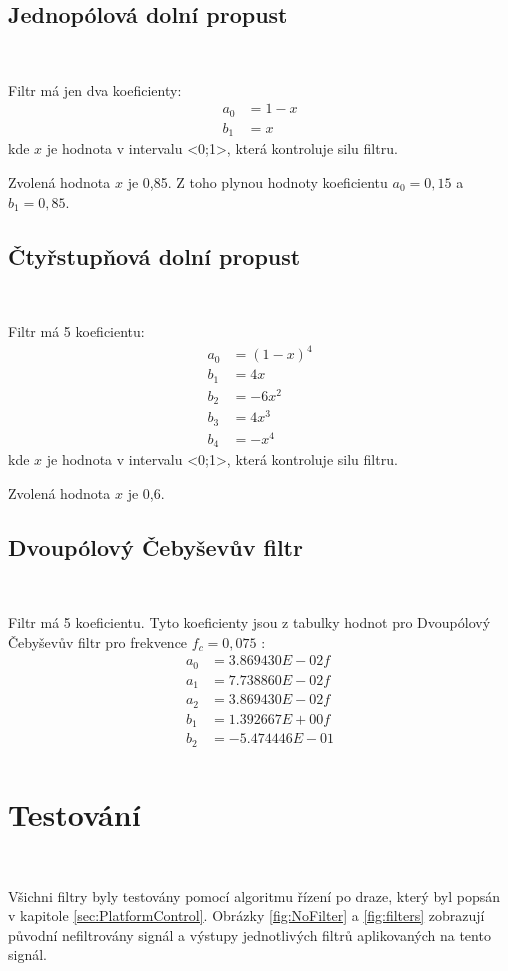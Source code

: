 \subsection{Jednopólová dolní propust}\

Filtr má jen dva koeficienty:
\begin{align}
a_0 &= 1 - x \\
b_1 &= x
\end{align}
kde $x$ je hodnota v intervalu <0;1>, která kontroluje silu filtru\cite{Filters}.

Zvolená hodnota $x$ je 0,85. Z toho plynou hodnoty koeficientu $a_0 = 0,15$ a
$b_1 = 0,85$.

\subsection{Čtyřstupňová dolní propust}\

Filtr má 5 koeficientu:
\begin{align}
a_0 &= (1 - x)^4 \\
b_1 &= 4x \\
b_2 &= -6x^2 \\
b_3 &= 4x^3 \\
b_4 &= -x^4
\end{align}
kde $x$ je hodnota v intervalu <0;1>, která kontroluje silu filtru\cite{Filters}.

Zvolená hodnota $x$ je 0,6.

\subsection{Dvoupólový Čebyševův filtr}\

Filtr má 5 koeficientu. Tyto koeficienty jsou z tabulky hodnot pro Dvoupólový Čebyševův filtr pro frekvence $f_c = 0,075$ \cite{Filters}:
\begin{align}
a_0 &= 3.869430E-02f \\
a_1 &= 7.738860E-02f \\
a_2 &= 3.869430E-02f \\
b_1 &= 1.392667E+00f \\
b_2 &= -5.474446E-01 \\
\end{align}

\section{Testování}\

Všichni filtry byly testovány pomocí algoritmu řízení po draze, který byl popsán
v kapitole \ref{sec:PlatformControl}. Obrázky \ref{fig:NoFilter} a \ref{fig:filters}
zobrazují původní nefiltrovány signál a výstupy jednotlivých filtrů
aplikovaných na tento signál.

